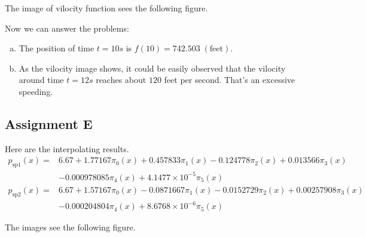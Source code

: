 \documentclass[11pt,en]{elegantpaper}
\begin{document}
The image of vilocity function sees the following figure.

\begin{center}
\end{center}

Now we can answer the problems:

\begin{enumerate}[(a)]
  \item The position of time $t=10s$ is $f(10)=742.503\;(\text{feet})$.
  \item As the vilocity image shows, it could be easily observed that the vilocity around time $t=12s$ reaches about $120$ feet per second. That's an excessive speeding.
\end{enumerate}

\subsection{Assignment E}

Here are the interpolating results.
\begin{align*}
  p_\text{sp1}(x) =& 6.67+1.77167\pi_{0}(x)+0.457833\pi_{1}(x)-0.124778\pi_{2}(x)+0.013566\pi_{3}(x)\\
                   & -0.000978085\pi_{4}(x)+4.1477\times 10^{-5}\pi_{5}(x)\\
  p_\text{sp2}(x) =& 6.67+1.57167\pi_{0}(x)-0.0871667\pi_{1}(x)-0.0152729\pi_{2}(x)+0.00257908\pi_{3}(x)\\
                   & -0.000204804\pi_{4}(x)+8.6768\times 10^{-6}\pi_{5}(x)
\end{align*}

The images see the following figure.
\end{document}
